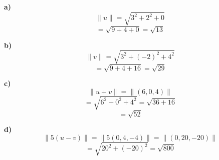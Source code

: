 \documentclass{article}
\begin{document}
\begin{minipage}[c]{0.5cm}
    \textbf{a)}
    $$\|u\| = \sqrt{3^2+2^2+0}$$
    $$= \sqrt{9+4+0} =\sqrt{13}$$
\end{minipage}\hspace*{3cm}
\begin{minipage}[c]{0.5cm}
    \textbf{b)}
    $$\|v\| = \sqrt{3^2+ (-2)^2+4^2}$$
    $$= \sqrt{9+4+16} = \sqrt{29}$$
\end{minipage}\hspace*{4cm}
\begin{minipage}[c]{0.5cm}
    \textbf{c)}
    $$\|u+v\| = \|(6, 0, 4)\|$$
    $$= \sqrt{6^2+0^2+4^2} = \sqrt{36+16}$$
    $$=\sqrt{52}$$
\end{minipage}
\vspace{10pt}

\begin{minipage}[c]{0.5cm}
    \textbf{d)}
    $$\|5(u-v)\| = \|5(0, 4, -4)\| = \|(0, 20, -20)\|$$
    $$= \sqrt{20^2+(-20)^2} = \sqrt{800}$$
\end{minipage}
\end{document}
